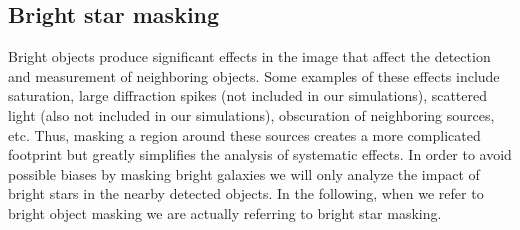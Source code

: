 \documentclass[\docopts]{\docclass}
\begin{document}
\subsection{Bright star masking}

Bright objects produce significant effects in the image that affect the detection and measurement of neighboring objects. Some examples of these effects include saturation, large diffraction spikes (not included in our simulations), scattered light (also not included in our simulations), obscuration of neighboring sources, etc. Thus, masking a region around these sources creates a more complicated footprint but greatly simplifies the analysis of systematic effects. In order to avoid possible biases by masking bright galaxies we will only analyze the impact of bright stars in the nearby detected objects. In the following, when we refer to bright object masking we are actually referring to bright star masking.
\end{document}
